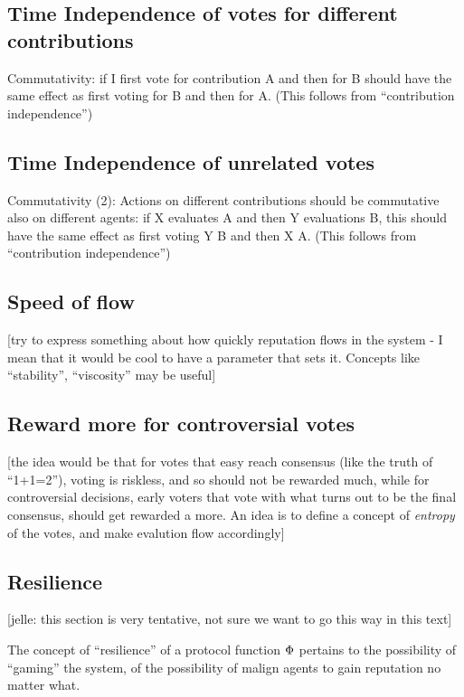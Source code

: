 \documentclass{article}
\begin{document}
\subsection{Time Independence of votes for different contributions}


Commutativity: if I first vote for contribution A and then for B should have the same effect as first voting for B and then for A.
(This follows from ``contribution independence'')

\subsection{Time Independence of unrelated votes}


Commutativity (2): Actions on different contributions should be commutative also on different agents: 
if X evaluates A and then Y evaluations B, this should have the same effect as first voting Y B and then X A.
(This follows from ``contribution independence'')

\subsection{Speed of flow}

[try to express something about how quickly reputation flows in the system - I mean that it would be cool to have a parameter that sets it. Concepts like ``stability'', ``viscosity'' may be useful]

\subsection{Reward more for controversial votes}

[the idea would be that for votes that easy reach consensus (like the truth of ``1+1=2''), voting is riskless, and so should not be rewarded much, while for controversial decisions, early voters that vote with what turns out to be the final consensus, should get rewarded a more. An idea is to define a concept of {\em entropy} of the votes, and make evalution flow accordingly]

\subsection{Resilience}

[jelle: this section is very tentative, not sure we want to go this way in this text]

The concept of ``resilience'' of a protocol function $\Phi$ pertains to the possibility of ``gaming'' the system, of the possibility of malign agents to gain reputation no matter what.
\end{document}
